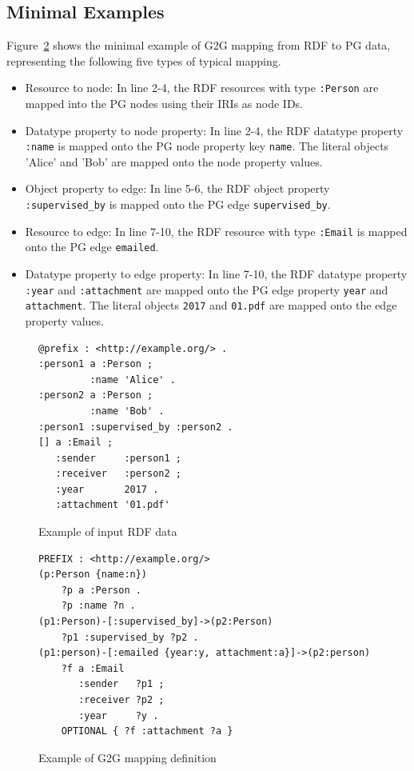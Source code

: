 \documentclass[runningheads]{llncs}
\begin{document}
\subsection{Minimal Examples}
Figure~\ref{fig:example-g2g} shows the minimal example of G2G mapping from RDF to PG data, representing the following five types of typical mapping.

\begin{itemize}
    \item Resource to node: In line 2-4, the RDF resources with type \texttt{:Person} are mapped into the PG nodes using their IRIs as node IDs.
    \item Datatype property to node property: In line 2-4, the RDF datatype property \texttt{:name} is mapped onto the PG node property key \texttt{name}. The literal objects 'Alice' and 'Bob' are mapped onto the node property values.
    \item Object property to edge: In line 5-6, the RDF object property \texttt{:supervised\_by} is mapped onto the PG edge \texttt{supervised\_by}.
    \item Resource to edge: In line 7-10, the RDF resource with type \texttt{:Email} is mapped onto the PG edge \texttt{emailed}. 
    \item Datatype property to edge property: In line 7-10, the RDF datatype property \texttt{:year} and \texttt{:attachment} are mapped onto the PG edge property \texttt{year} and \texttt{attachment}. The literal objects \texttt{2017} and \texttt{01.pdf} are mapped onto the edge property values.
\end{itemize}


\begin{figure}[!t]
\begin{scriptsize}
\begin{verbatim}
@prefix : <http://example.org/> .
:person1 a :Person ;
         :name 'Alice' .
:person2 a :Person ;
         :name 'Bob' .
:person1 :supervised_by :person2 .
[] a :Email ;
   :sender     :person1 ;
   :receiver   :person2 ;
   :year       2017 .
   :attachment '01.pdf'
\end{verbatim}
\end{scriptsize}
\caption{Example of input RDF data}
\label{fig:example-rdf}
\end{figure}


\begin{figure}[!t]
\begin{scriptsize}
\begin{verbatim}
PREFIX : <http://example.org/>
(p:Person {name:n})
    ?p a :Person .
    ?p :name ?n .
(p1:Person)-[:supervised_by]->(p2:Person)
    ?p1 :supervised_by ?p2 .
(p1:person)-[:emailed {year:y, attachment:a}]->(p2:person)
    ?f a :Email
       :sender   ?p1 ;
       :receiver ?p2 ;
       :year     ?y .
    OPTIONAL { ?f :attachment ?a }
\end{verbatim}
\end{scriptsize}
\caption{Example of G2G mapping definition}
\label{fig:example-g2g}
\end{figure}
\end{document}
